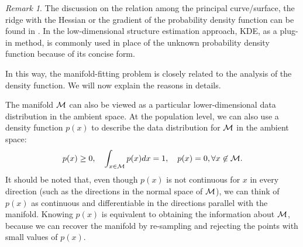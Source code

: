 \documentclass[aos,preprint]{imsart}
\theoremstyle{remark}
\newtheorem*{remark}{Remark}
\begin{document}
\begin{remark}   
The discussion on the relation among the principal curve/surface, the ridge with the Hessian or the gradient of the probability density function can be found in \cite{ozertem2011locally,genovese2014nonparametric,mohammed2017manifold}. In the low-dimensional structure estimation approach, KDE, as a plug-in method, is commonly used in place of the unknown probability density function because of its concise form. %
\end{remark}


In this way, the manifold-fitting problem is closely related to the analysis of the density function. We will now explain the reasons in details.

The manifold $\cal M$ can also be viewed as a particular lower-dimensional data distribution in the ambient space. At the population level, we can also use a density function $p(x)$ to describe the data distribution for $\cal M$ in the ambient space:
\[
p(x)\geq 0,\quad  \int_{x\in \cal M} p(x)dx=1, \quad p(x) = 0, \forall x\not \in \cal M.
\] 
It should be noted that, even though $p(x)$ is not continuous for $x$ in every direction (such as the directions in the normal space of $\cal M$), we can think of $p(x)$ as continuous and differentiable in the directions parallel with the manifold. Knowing $p(x)$ is equivalent to obtaining the information about $\cal M$, because we can recover the manifold by re-sampling and rejecting the points with small values of $p(x)$.
\end{document}
